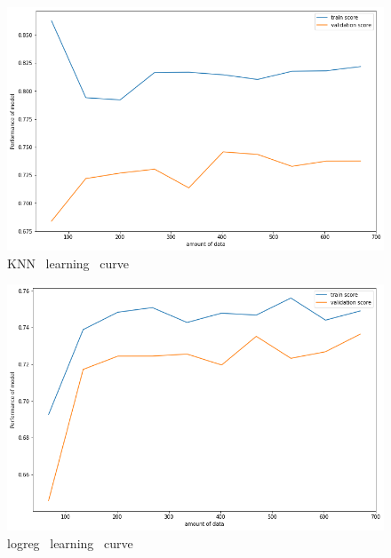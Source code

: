 \documentclass[12pt]{article}
\begin{document}
\begin{figure}[H]
\begin{center}
\includegraphics[scale=0.5]{learning_curve_1.png} 
\caption[]{ KNN \ learning \ curve }
\end{center}
\end{figure}

\begin{figure}[H]
\begin{center}
\includegraphics[scale=0.5]{learning_curve_2.png} 
\caption[]{ logreg \ learning \ curve }
\end{center}
\end{figure}
\end{document}
